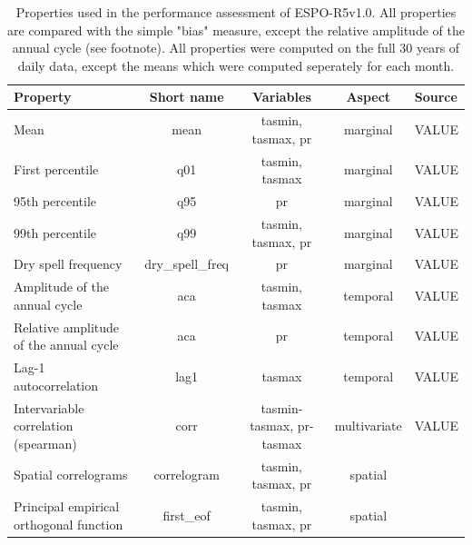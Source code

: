 \documentclass[letterpaper,10pt]{article}
\begin{document}
\begin{table}[!ht]
    \centering
    \caption{Properties used in the performance assessment of ESPO-R5v1.0. All properties are compared with the simple "bias" measure, except the relative amplitude of the annual cycle (see footnote). All properties were computed on the full 30 years of daily data, except the means which were computed seperately for each month.}
    \begin{tabular}{l|c|c|c|l}
    \hline
    Property                               & Short name & Variables          & Aspect   & Source \\ \hline
    Mean                                   & mean       & tasmin, tasmax, pr & marginal & VALUE \\ \hline
    First percentile                       & q01        & tasmin, tasmax     & marginal & VALUE \\ \hline
    95th percentile                        & q95        & pr                 & marginal & VALUE \\ \hline
    99th percentile                        & q99        & tasmin, tasmax, pr & marginal & VALUE \\ \hline
    Dry spell frequency                    & dry\_spell\_freq & pr           & marginal & VALUE \\ \hline
    Amplitude of the annual cycle          & aca        & tasmin, tasmax     & temporal & VALUE \\ \hline
    Relative amplitude of the annual cycle & aca        & pr                 & temporal & VALUE \\ \hline
    Lag-1 autocorrelation                  & lag1       & tasmax             & temporal & VALUE \\ \hline
    Intervariable correlation (spearman)   & corr       & tasmin-tasmax, pr-tasmax & multivariate & VALUE \\ \hline
    Spatial correlograms                   & correlogram & tasmin, tasmax, pr & spatial & \cite{Francois2020} \\\hline
    Principal empirical orthogonal function& first\_eof & tasmin, tasmax, pr & spatial & \cite{Vrac2018} \\ \hline
    \end{tabular}
    \label{tab:props}

\end{table}
\end{document}
